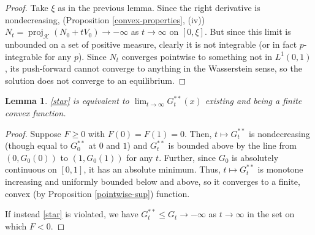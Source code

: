 \documentclass[10pt,a4paper]{amsart}
\newtheorem{lemma}[thm]{Lemma}
\numberwithin{equation}{section}
\DeclareMathOperator{\proj}{proj}
\begin{document}
\begin{proof}
    Take $\xi$ as in the previous lemma. Since the right derivative is nondecreasing, (Proposition \ref{convex-properties}, \textup{(iv)}) $N_t=\proj_{\mathcal{K}}(N_0+tV_0)\to-\infty$ as $t\to\infty$ on $[0,\xi]$. %
    But since this limit is unbounded on a set of positive measure, clearly it is not integrable (or in fact $p$-integrable for any $p$). Since $N_t$ converges pointwise to something not in $L^1(0,1)$, its push-forward cannot converge to anything in the Wasserstein sense, so the solution does not converge to an equilibrium.
\end{proof}

\begin{lemma}\label{exist-finite-lemma}
    \eqref{star} is equivalent to $\displaystyle \lim_{t\to\infty} G_t^{**}(x)$ existing and being a finite convex function. 
\end{lemma}
\begin{proof}
    Suppose $F\geq0$ with $F(0)=F(1)=0$. Then, $t\mapsto G_t^{**}$ is nondecreasing (though equal to $G_0^{**}$ at $0$ and $1$) and $G_t^{**}$ is bounded above by the line from $(0,G_0(0))$ to $(1,G_0(1))$ for any $t$. Further, since $G_0$ is absolutely continuous on $[0,1]$, it has an absolute minimum. Thus, $t\mapsto G_t^{**}$ is monotone increasing and uniformly bounded below and above, so it converges to a finite, convex (by Proposition \ref{pointwise-sup}) function.  

    If instead \eqref{star} is violated, we have $G_t^{**}\leq G_t\to-\infty$ as $t\to\infty$ in the set on which $F<0$. 
\end{proof}
\end{document}
